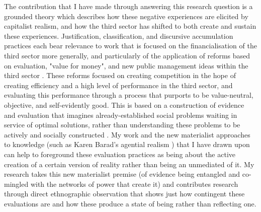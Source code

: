 The contribution that I have made through answering this research question is a grounded theory which describes how these negative experiences are elicited by capitalist realism, and how the third sector has shifted to both create and sustain these experiences. Justification, classification, and discursive accumulation practices each bear relevance to work that is focused on the financialisation of the third sector more generally, and particularly of the application of reforms based on evaluation, "value for money", and new public management ideas within the third sector \citep{mcmullin_challenging_2021}. These reforms focused on creating competition in the hope of creating efficiency and a high level of performance in the third sector, and evaluating this performance through a process that purports to be value-neutral, objective, and self-evidently good. This is based on a construction of evidence and evaluation that imagines already-established social problems waiting in service of optimal solutions, rather than understanding these problems to be actively and socially constructed \citep{greenhalgh_evidence-based_2009}. My work and the new materialist approaches to knowledge (such as Karen Barad's agential realism \citep[p. 45]{barad_meeting_2007}) that I have drawn upon can help to foreground these evaluation practices as being about the active creation of a certain version of reality rather than being an unmediated of it. My research takes this new materialist premise (of evidence being   entangled and co-mingled with the networks of power that create it) and contributes research through direct ethnographic observation that shows just how contingent these evaluations are and how these produce a state of being rather than reflecting one.

